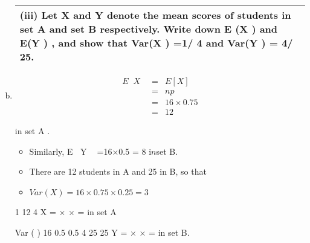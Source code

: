 \documentclass[a4paper,12pt]{article}
\begin{document}
\begin{enumerate}[(a)]
\begin{table}[ht!]
 \centering
 \begin{tabular}{|p{15cm}|}
 \hline
\noindent (iii) Let X and Y denote the mean scores of students in set A and set B
respectively. Write down E (X ) and E(Y ) , and show that
Var(X ) =1/ 4 and Var(Y ) = 4/ 25.
\\ \hline
  \end{tabular}
\end{table}
\item 
\begin{eqnarray*}
E X  &=& E[X ] \\
&=& np \\
&=& 16\times 0.75 \\
&=& 12 
\end{eqnarray*}

in set A .

\begin{itemize}
\item Similarly, E Y  =16×0.5 = 8 i$n$set B.
\item There are 12 students in A and 25 in B, so that
\item $Var (X)  = 16 \times 0.75 \times 0.25 = 3$
\end{itemize}

 1
12 4
X = × × = in set A

Var ( ) 16 0.5 0.5 4
25 25
Y = × × = in set B.

\end{enumerate}
\end{document}
